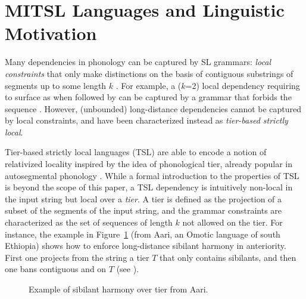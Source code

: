 \documentclass[11pt,a4paper]{article}
\begin{document}
\section{MITSL Languages and Linguistic Motivation}
\label{sec:length}

%
Many dependencies in phonology can be captured by SL grammars: \emph{local constraints} that only make distinctions on the basis of contiguous substrings of segments up to some length $k$ \citep[essentially, $k$-grams;][]{Heinz2011a}.
For example, a ($k$=2) local dependency requiring  to surface as \textipa{[z]} when followed by \textipa{[l]} can be captured by a grammar that forbids the sequence \textipa{[sl]}.
However, (unbounded) long-distance dependencies cannot be captured by local constraints, and have been characterized instead as \emph{tier-based strictly local}.

Tier-based strictly local languages (TSL) are able to encode a notion of relativized locality inspired by the idea of phonological tier, already popular in autosegmental phonology   \cite{goldsmith1976autosegmental}.
While a  formal introduction  to the properties of TSL  is beyond the scope of this paper,  a TSL dependency is intuitively non-local in the input string but local over a \emph{tier}.
A tier is defined as the projection of a subset of the segments of the input string, and the grammar constraints are characterized as the set of sequences of length $k$ not allowed on the tier.
For instance, the example in Figure~\ref{fig:Aari} (from Aari, an Omotic language of south Ethiopia) shows how to enforce long-distance sibilant harmony in anteriority.
First one projects from the string a tier $T$ that only contains sibilants, and then one bans contiguous \textipa{[\textctyogh s]} and \textipa{[s\textctyogh]} on $T$ (see \cite{Hayward_Aari}).
%
 \begin{figure}[h!]
\begin{center}

\end{center}
\caption{Example of sibilant harmony over tier from Aari. }
\label{fig:Aari}
\end{figure}
\end{document}
